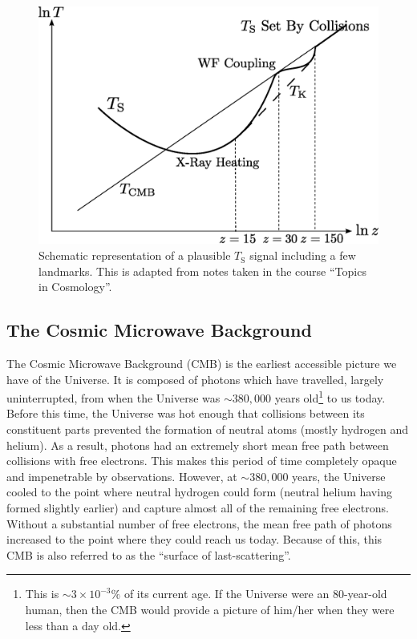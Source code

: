 \begin{figure}[h]
  \centering
  \includegraphics[width=12cm]{TsEvolution.eps}
  \caption{Schematic representation of a plausible $T_{\text{S}}$ signal including a few landmarks. This is adapted from notes taken in the course ``Topics in Cosmology''.}
  \label{fig:TsEvolution}
\end{figure}



\subsection{The Cosmic Microwave Background}\label{sec:CMB}


The Cosmic Microwave Background (CMB) is the earliest accessible picture we have of the Universe. It is composed of photons which have travelled, largely uninterrupted, from when the Universe was $\sim380,000$ years old\footnote{This is $\sim3\times 10^{-3}\%$ of its current age. If the Universe were an 80-year-old human, then the CMB would provide a picture of him/her when they were less than a day old.} to us today. Before this time, the Universe was hot enough that collisions between its constituent parts prevented the formation of neutral atoms (mostly hydrogen and helium). As a result, photons had an extremely short mean free path between collisions with free electrons. This makes this period of time completely opaque and impenetrable by observations. However, at $\sim380,000$ years, the Universe cooled to the point where neutral hydrogen could form (neutral helium having formed slightly earlier) and capture almost all of the remaining free electrons. Without a substantial number of free electrons, the mean free path of photons increased to the point where they could reach us today. Because of this, this CMB is also referred to as the ``surface of last-scattering''.


